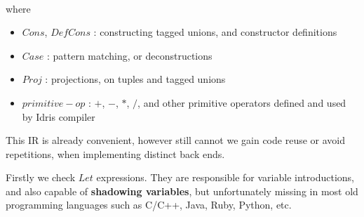 \documentclass[a1,portrait]{a1poster}
\begin{document}
\begin{multicols}{2}
\begin{multicols}{2}
\begin{minipage}[b]{1\linewidth}
\begin{bnf*}
    \\
    \\
    \\
    \\
    \\   
    \\
    \\
    \\
    \\
    \\
    \\
\end{bnf*}
\end{minipage}

\end{multicols}

where

\begin{itemize}

\item $Cons$, $DefCons$ : constructing tagged unions, and constructor definitions
\item $Case$ : pattern matching, or deconstructions
\item $Proj$ : projections, on tuples and tagged unions
\item $primitive-op$ : $+$, $-$, $*$, $/$, and other primitive operators defined and used by Idris compiler

\end{itemize}

This IR is already convenient, however still cannot we gain code reuse or avoid repetitions,
when implementing distinct back ends.


Firstly we check $Let$ expressions. They are responsible for variable introductions,
and also capable of \textbf{shadowing variables}, but unfortunately missing in most old programming languages
such as C/C++, Java, Ruby, Python, etc.


\end{multicols}
\end{document}
